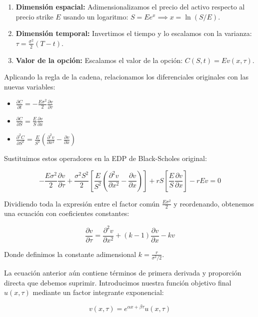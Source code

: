 \documentclass[12pt, a4paper]{article}
\begin{document}
\begin{enumerate}
    \item \textbf{Dimensión espacial:} Adimensionalizamos el precio del activo respecto al precio strike $E$ usando un logaritmo: $S = E e^x \implies x = \ln(S/E)$.
    \item \textbf{Dimensión temporal:} Invertimos el tiempo y lo escalamos con la varianza: $\tau = \frac{\sigma^2}{2}(T - t)$.
    \item \textbf{Valor de la opción:} Escalamos el valor de la opción: $C(S, t) = E v(x, \tau)$.
\end{enumerate}

Aplicando la regla de la cadena, relacionamos los diferenciales originales con las nuevas variables:

\begin{itemize}
    \item $\frac{\partial C}{\partial t} = -\frac{E \sigma^2}{2} \frac{\partial v}{\partial \tau}$
    \item $\frac{\partial C}{\partial S} = \frac{E}{S} \frac{\partial v}{\partial x}$
    \item $\frac{\partial^2 C}{\partial S^2} = \frac{E}{S^2} \left( \frac{\partial^2 v}{\partial x^2} - \frac{\partial v}{\partial x} \right)$
\end{itemize}

Sustituimos estos operadores en la EDP de Black-Scholes original:

\[ -\frac{E \sigma^2}{2} \frac{\partial v}{\partial \tau} + \frac{\sigma^2 S^2}{2} \left[ \frac{E}{S^2} \left( \frac{\partial^2 v}{\partial x^2} - \frac{\partial v}{\partial x} \right) \right] + r S \left[ \frac{E}{S} \frac{\partial v}{\partial x} \right] - r E v = 0 \]

Dividiendo toda la expresión entre el factor común $\frac{E \sigma^2}{2}$ y reordenando, obtenemos una ecuación con coeficientes constantes:

\[ \frac{\partial v}{\partial \tau} = \frac{\partial^2 v}{\partial x^2} + (k - 1) \frac{\partial v}{\partial x} - kv \]

Donde definimos la constante adimensional $k = \frac{r}{\sigma^2/2}$.

La ecuación anterior aún contiene términos de primera derivada y proporción directa que debemos suprimir. Introducimos nuestra función objetivo final $u(x, \tau)$ mediante un factor integrante exponencial:

\[ v(x, \tau) = e^{\alpha x + \beta \tau} u(x, \tau) \]
\end{document}
